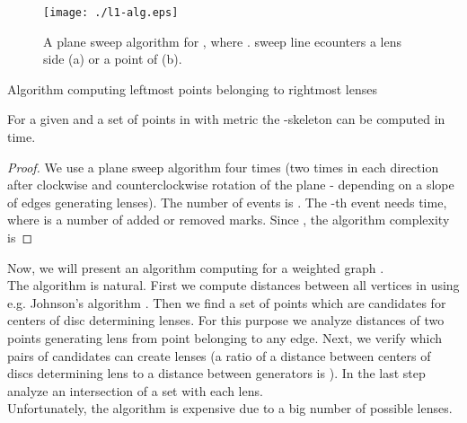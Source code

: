 \documentclass[11pt]{llncs}
\begin{document}
\begin{figure}[htbp]
\centering
\texttt{[image: ./l1-alg.eps]}
\caption{A plane sweep algorithm for , where .
sweep line ecounters a lens side (a) or a point of  (b). }
\label{fig:l1-alg}
\end{figure}   

  
\begin{algorithm}[H]
\footnotesize{
\BlankLine

}
\caption{Algorithm computing leftmost points belonging to rightmost lenses}
\label{alg-2}   
\end{algorithm}   

\begin{theorem}
For a given  and a set  of  points in  with  metric 
the -skeleton  can be computed in  time.
\end{theorem}
\begin{proof}
We use a plane sweep algorithm four times (two times in each direction after clockwise 
and counterclockwise rotation of the plane - depending on a slope of edges generating lenses).
The number of events is . The -th event needs  time, where 
 is a number of added or removed marks. Since , the algorithm complexity is 

\end{proof}



Now, we will present an algorithm computing  for a weighted graph .\\
The algorithm is natural. First we compute distances between all vertices in  using 
e.g. Johnson's algorithm \cite{clrs09}. Then we find a set of points which are candidates for centers
of disc determining lenses. For this purpose we analyze distances of two points generating lens
from point belonging to any edge. Next, we verify which pairs of candidates can create lenses
(a ratio of a distance between centers of discs determining lens to a distance between generators
is ). In the last step analyze an intersection of a set  with each lens. \\
Unfortunately, the algorithm is expensive due to a big number of possible lenses.
\end{document}
